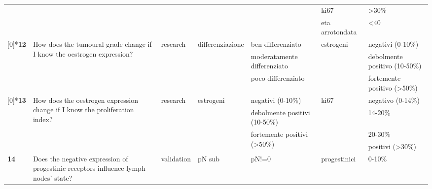 \begin{sidewaystable*}[h]
\begin{tabularx}{\textwidth}{lXllllX}
		      &       &       &       &       & ki67  & >30\% \\
		      &       &       &       &       & eta arrotondata & <40 \\
      \addlinespace[9ex]
	      \multirow{3}[0]{*}{\textbf{12}} & \multirow{3}[0]{4cm}{How does the tumoural grade change if I know the oestrogen expression?} & \multirow{3}[0]{*}{research} & \multirow{3}[0]{*}{differenziazione} &  ben differenziato & \multirow{3}[0]{*}{estrogeni} & negativi (0-10\%) \\
		      &       &       &       &  moderatamente differenziato &       & debolmente positivo (10-50\%) \\
		      &       &       &       &  poco differenziato &       & fortemente positivo (>50\%) \\
	      \addlinespace[1ex]
		\multirow{4}[0]{*}{\textbf{13}} & \multirow{4}[0]{4cm}{How does the oestrogen expression change if I know the proliferation index?} & \multirow{4}[0]{*}{research} & \multirow{4}[0]{*}{estrogeni} &  negativi (0-10\%) & \multirow{4}[0]{*}{ki67} & negativo (0-14\%) \\
		      &       &       &       &  debolmente positivi (10-50\%) &       & 14-20\% \\
		      &       &       &       & \multirow{2}[0]{*}{fortemente positivi (>50\%)} &       & 20-30\% \\
		      &       &       &       &       &       & positivi (>30\%) \\
      \addlinespace[1ex]
	      \textbf{14} & Does the negative expression of progestinic receptors influence lymph nodes' state? & validation & pN sub & pN!=0  & progestinici & 0-10\% \\
      \end{tabularx}
	\label{app:conditionalprobability2}
\end{sidewaystable*}

